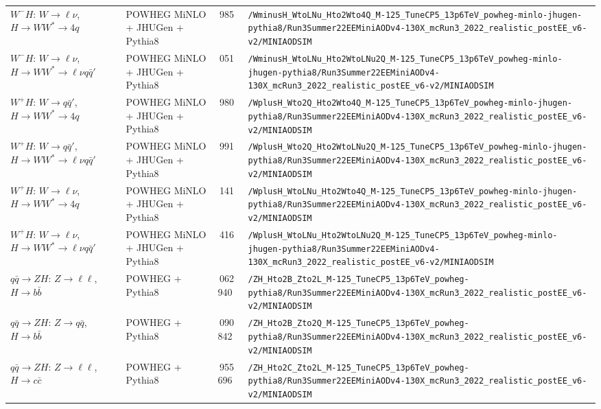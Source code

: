 \begin{landscape}
\begin{longtable}{@{}>{\raggedright\arraybackslash}p{3.2cm}>{\raggedright\arraybackslash}p{3.6cm}>{\raggedleft\arraybackslash}p{1.6cm}>{\raggedright\arraybackslash}p{13.5cm}@{}}
$W^-H$: $W\to \ell\nu$, $H\to WW^*\to 4q$ & POWHEG MiNLO + JHUGen + Pythia8 & 699\,985 & \nolinkurl{/WminusH_WtoLNu_Hto2Wto4Q_M-125_TuneCP5_13p6TeV_powheg-minlo-jhugen-pythia8/Run3Summer22EEMiniAODv4-130X_mcRun3_2022_realistic_postEE_v6-v2/MINIAODSIM} \\
$W^-H$: $W\to \ell\nu$, $H\to WW^*\to\ell\nu q\bar q'$ & POWHEG MiNLO + JHUGen + Pythia8 & 698\,051 & \nolinkurl{/WminusH_WtoLNu_Hto2WtoLNu2Q_M-125_TuneCP5_13p6TeV_powheg-minlo-jhugen-pythia8/Run3Summer22EEMiniAODv4-130X_mcRun3_2022_realistic_postEE_v6-v2/MINIAODSIM} \\
$W^+H$: $W\to q\bar q'$, $H\to WW^*\to 4q$ & POWHEG MiNLO + JHUGen + Pythia8 & 699\,980 & \nolinkurl{/WplusH_Wto2Q_Hto2Wto4Q_M-125_TuneCP5_13p6TeV_powheg-minlo-jhugen-pythia8/Run3Summer22EEMiniAODv4-130X_mcRun3_2022_realistic_postEE_v6-v2/MINIAODSIM} \\
$W^+H$: $W\to q\bar q'$, $H\to WW^*\to\ell\nu q\bar q'$ & POWHEG MiNLO + JHUGen + Pythia8 & 699\,991 & \nolinkurl{/WplusH_Wto2Q_Hto2WtoLNu2Q_M-125_TuneCP5_13p6TeV_powheg-minlo-jhugen-pythia8/Run3Summer22EEMiniAODv4-130X_mcRun3_2022_realistic_postEE_v6-v2/MINIAODSIM} \\
$W^+H$: $W\to \ell\nu$, $H\to WW^*\to 4q$ & POWHEG MiNLO + JHUGen + Pythia8 & 696\,141 & \nolinkurl{/WplusH_WtoLNu_Hto2Wto4Q_M-125_TuneCP5_13p6TeV_powheg-minlo-jhugen-pythia8/Run3Summer22EEMiniAODv4-130X_mcRun3_2022_realistic_postEE_v6-v2/MINIAODSIM} \\
$W^+H$: $W\to \ell\nu$, $H\to WW^*\to\ell\nu q\bar q'$ & POWHEG MiNLO + JHUGen + Pythia8 & 688\,416 & \nolinkurl{/WplusH_WtoLNu_Hto2WtoLNu2Q_M-125_TuneCP5_13p6TeV_powheg-minlo-jhugen-pythia8/Run3Summer22EEMiniAODv4-130X_mcRun3_2022_realistic_postEE_v6-v2/MINIAODSIM} \\
$q\bar q\to ZH$: $Z\to \ell\ell$, $H\to b\bar b$ & POWHEG + Pythia8 & 2\,062\,940 & \nolinkurl{/ZH_Hto2B_Zto2L_M-125_TuneCP5_13p6TeV_powheg-pythia8/Run3Summer22EEMiniAODv4-130X_mcRun3_2022_realistic_postEE_v6-v2/MINIAODSIM} \\
$q\bar q\to ZH$: $Z\to q\bar q$, $H\to b\bar b$ & POWHEG + Pythia8 & 4\,090\,842 & \nolinkurl{/ZH_Hto2B_Zto2Q_M-125_TuneCP5_13p6TeV_powheg-pythia8/Run3Summer22EEMiniAODv4-130X_mcRun3_2022_realistic_postEE_v6-v2/MINIAODSIM} \\
$q\bar q\to ZH$: $Z\to \ell\ell$, $H\to c\bar c$ & POWHEG + Pythia8 & 2\,955\,696 & \nolinkurl{/ZH_Hto2C_Zto2L_M-125_TuneCP5_13p6TeV_powheg-pythia8/Run3Summer22EEMiniAODv4-130X_mcRun3_2022_realistic_postEE_v6-v2/MINIAODSIM} \\

\end{longtable}
\end{landscape}
